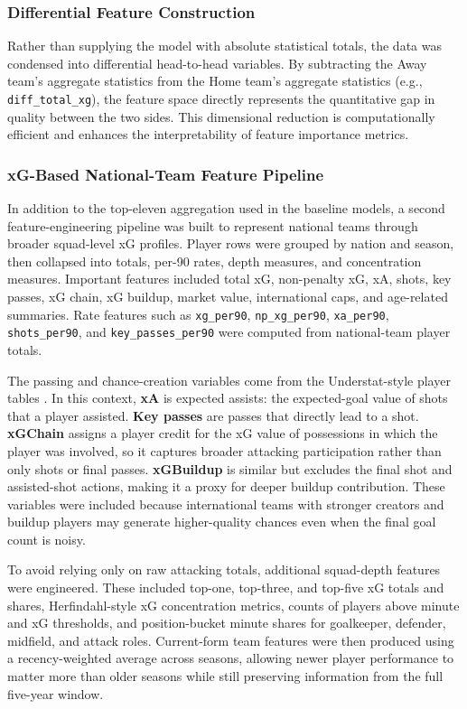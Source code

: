 \documentclass[11pt]{article}
\begin{document}
\subsubsection{Differential Feature Construction}
\label{subsec:differential_features}
Rather than supplying the model with absolute statistical totals, the data was condensed into differential head-to-head variables. By subtracting the Away team's aggregate statistics from the Home team's aggregate statistics (e.g., \texttt{diff\_total\_xg}), the feature space directly represents the quantitative gap in quality between the two sides. This dimensional reduction is computationally efficient and enhances the interpretability of feature importance metrics.

\subsubsection{xG-Based National-Team Feature Pipeline}
\label{subsec:xg_pipeline}
In addition to the top-eleven aggregation used in the baseline models, a second feature-engineering pipeline was built to represent national teams through broader squad-level xG profiles. Player rows were grouped by nation and season, then collapsed into totals, per-90 rates, depth measures, and concentration measures. Important features included total xG, non-penalty xG, xA, shots, key passes, xG chain, xG buildup, market value, international caps, and age-related summaries. Rate features such as \texttt{xg\_per90}, \texttt{np\_xg\_per90}, \texttt{xa\_per90}, \texttt{shots\_per90}, and \texttt{key\_passes\_per90} were computed from national-team player totals.

The passing and chance-creation variables come from the Understat-style player tables \cite{understat}. In this context, \textbf{xA} is expected assists: the expected-goal value of shots that a player assisted. \textbf{Key passes} are passes that directly lead to a shot. \textbf{xGChain} assigns a player credit for the xG value of possessions in which the player was involved, so it captures broader attacking participation rather than only shots or final passes. \textbf{xGBuildup} is similar but excludes the final shot and assisted-shot actions, making it a proxy for deeper buildup contribution. These variables were included because international teams with stronger creators and buildup players may generate higher-quality chances even when the final goal count is noisy.

To avoid relying only on raw attacking totals, additional squad-depth features were engineered. These included top-one, top-three, and top-five xG totals and shares, Herfindahl-style xG concentration metrics, counts of players above minute and xG thresholds, and position-bucket minute shares for goalkeeper, defender, midfield, and attack roles. Current-form team features were then produced using a recency-weighted average across seasons, allowing newer player performance to matter more than older seasons while still preserving information from the full five-year window.
\end{document}
